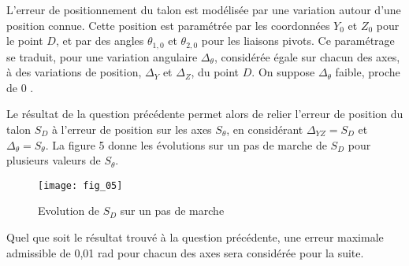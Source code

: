 L'erreur de positionnement du talon est modélisée par une variation autour d'une position connue. Cette position est paramétrée par les coordonnées $Y_{0}$ et $Z_{0}$ pour le point $D$, et par des angles $\theta_{1,0}$ et $\theta_{2,0}$ pour les liaisons pivots. Ce paramétrage se traduit, pour une variation angulaire $\Delta_{\theta}$, considérée égale sur chacun des axes, à des variations de position, $\Delta_{Y}$ et $\Delta_{Z}$, du point $D$. On suppose $\Delta_{\theta}$ faible, proche de 0 .

\ifprof
\begin{corrige}
\end{corrige}
\else
\fi

\ifprof
\begin{corrige}
\end{corrige}
\else
\fi

Le résultat de la question précédente permet alors de relier l'erreur de position du talon $S_{D}$ à l'erreur de position sur les axes $S_{\theta}$, en considérant $\Delta_{Y Z}=S_{D}$ et $\Delta_{\theta}=S_{\theta}$. La figure 5 donne les évolutions sur un pas de marche de $S_{D}$ pour plusieurs valeurs de $S_{\theta}$.
\ifprof
\begin{corrige}
\end{corrige}
\else
\fi

\begin{figure}[!h]
\centering
\texttt{[image: fig\_05]}
\caption{Evolution de $S_D$ sur un pas de marche\label{ccs_psi_2023_fig_05}}
\end{figure}

Quel que soit le résultat trouvé à la question précédente, une erreur maximale admissible de 0,01 rad pour chacun des axes sera considérée pour la suite.

